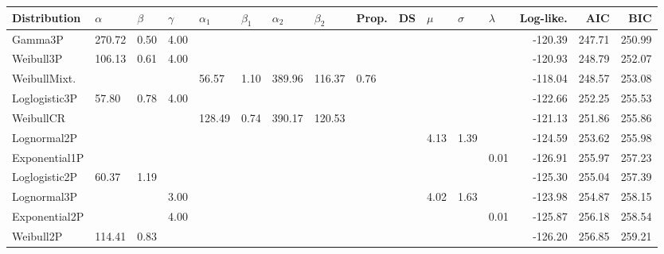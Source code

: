 \documentclass[a4, 11pt]{article}
\theoremstyle{definition}
\theoremstyle{remark}
\begin{document}
\begin{table}[H]
    \tiny
    \centering
    \begin{tabular}{|l|l|l|l|l|l|l|l|l|l|l|l|l|r|r|r|}
        \hline
        \textbf{Distribution} &
        $\alpha$ &
        $\beta$ &
        $\gamma$ &
        $\alpha_1$ &
        $\beta_1$ &
        $\alpha_2$ &
        $\beta_2$ &
        Prop.&
        DS &
        $\mu$ &
        $\sigma$ &
        $\lambda$ &
        \textbf{Log-like.} &
        \textbf{AIC} &
        \textbf{BIC} \\ \hline
        Gamma3P       & 270.72 & 0.50 & 4.00 &        &      &        &        &      &      &        &        &      & -120.39 & 247.71 & 250.99 \\ \hline
        Weibull3P     & 106.13 & 0.61 & 4.00 &        &      &        &        &      &      &        &        &      & -120.93 & 248.79 & 252.07 \\ \hline
        WeibullMixt.  &        &      &      & 56.57  & 1.10 & 389.96 & 116.37 & 0.76 &      &        &        &      & -118.04 & 248.57 & 253.08 \\ \hline
        Loglogistic3P & 57.80  & 0.78 & 4.00 &        &      &        &        &      &      &        &        &      & -122.66 & 252.25 & 255.53 \\ \hline
        WeibullCR     &        &      &      & 128.49 & 0.74 & 390.17 & 120.53 &      &      &        &        &      & -121.13 & 251.86 & 255.86 \\ \hline
        Lognormal2P   &        &      &      &        &      &        &        &      &      & 4.13   & 1.39   &      & -124.59 & 253.62 & 255.98 \\ \hline
        Exponential1P &        &      &      &        &      &        &        &      &      &        &        & 0.01 & -126.91 & 255.97 & 257.23 \\ \hline
        Loglogistic2P & 60.37  & 1.19 &      &        &      &        &        &      &      &        &        &      & -125.30 & 255.04 & 257.39 \\ \hline
        Lognormal3P   &        &      & 3.00 &        &      &        &        &      &      & 4.02   & 1.63   &      & -123.98 & 254.87 & 258.15 \\ \hline
        Exponential2P &        &      & 4.00 &        &      &        &        &      &      &        &        & 0.01 & -125.87 & 256.18 & 258.54 \\ \hline
        Weibull2P     & 114.41 & 0.83 &      &        &      &        &        &      &      &        &        &      & -126.20 & 256.85 & 259.21 \\ \hline

\end{tabular}
\end{table}
\end{document}

